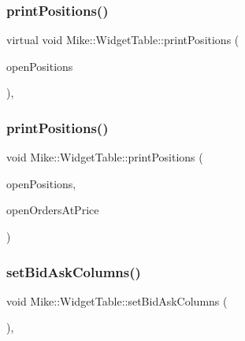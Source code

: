 \subsubsection{\texorpdfstring{print\+Positions()}{printPositions()}\hspace{0.1cm}{\footnotesize\ttfamily [1/2]}}
{\footnotesize\ttfamily virtual void Mike\+::\+Widget\+Table\+::print\+Positions (\begin{DoxyParamCaption}\item[{const std\+::vector$<$ \hyperlink{class_mike_1_1_mike_position}{Mike\+Position} $>$ $\ast$}]{open\+Positions }\end{DoxyParamCaption})\hspace{0.3cm}{\ttfamily [inline]}, {\ttfamily [virtual]}}

\mbox{\label{class_mike_1_1_widget_table_a4ed53614a2ef8bc68994a84af4b30084}} 
\subsubsection{\texorpdfstring{print\+Positions()}{printPositions()}\hspace{0.1cm}{\footnotesize\ttfamily [2/2]}}
{\footnotesize\ttfamily void Mike\+::\+Widget\+Table\+::print\+Positions (\begin{DoxyParamCaption}\item[{const std\+::vector$<$ \hyperlink{class_mike_1_1_mike_position}{Mike\+Position} $>$ $\ast$}]{open\+Positions,  }\item[{const std\+::vector$<$ \hyperlink{class_mike_1_1_mike_orders_at_price}{Mike\+Orders\+At\+Price} $>$ $\ast$}]{open\+Orders\+At\+Price }\end{DoxyParamCaption})\hspace{0.3cm}{\ttfamily [virtual]}}

\mbox{\label{class_mike_1_1_widget_table_ae788064f6ed7b19e9ac42b717ff53567}} 
\subsubsection{\texorpdfstring{set\+Bid\+Ask\+Columns()}{setBidAskColumns()}}
{\footnotesize\ttfamily void Mike\+::\+Widget\+Table\+::set\+Bid\+Ask\+Columns (\begin{DoxyParamCaption}{ }\end{DoxyParamCaption})\hspace{0.3cm}{\ttfamily [protected]}, {\ttfamily [virtual]}}

